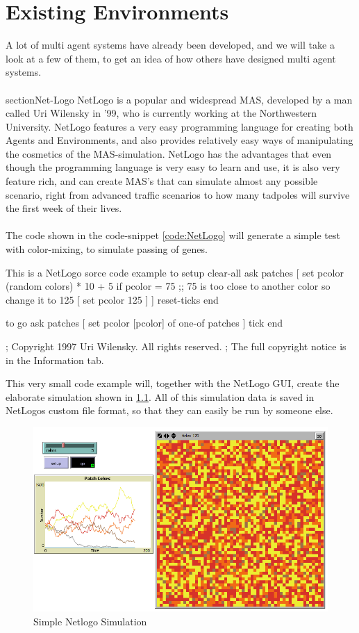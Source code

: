 \chapter{Existing Environments}

A lot of multi agent systems have already been developed, and we will take a look at a few of them, to get an idea of how others have designed multi agent systems.\\
\\
section{Net-Logo}
NetLogo is a popular and widespread MAS, developed by a man called Uri Wilensky in '99, who is currently working at the Northwestern University. \cite{misc:northwestern}
\indent NetLogo features a very easy programming language for creating both Agents and Environments, and also provides relatively easy ways of manipulating the cosmetics of the MAS-simulation. NetLogo has the advantages that even though the programming language is very easy to learn and use, it is also very feature rich, and can create MAS's that can simulate almost any possible scenario, right from advanced traffic scenarios to how many tadpoles will survive the first week of their lives. \\
\\
The code shown in the code-snippet \ref{code:NetLogo} will generate a simple test with color-mixing, to simulate passing of genes.

\begin{NetLogo}{This is a NetLogo sorce code example \label{code:NetLogo}}{}
to setup
  clear-all
  ask patches
    [ set pcolor (random colors) * 10 + 5
        if pcolor = 75  ;; 75 is too close to another color so change it to 125
          [ set pcolor 125 ] ]
  reset-ticks
end

to go
  ask patches [ set pcolor [pcolor] of one-of patches ]
  tick
end


; Copyright 1997 Uri Wilensky. All rights reserved.
; The full copyright notice is in the Information tab.
\end{NetLogo}

This very small code example will, together with the NetLogo GUI, create the elaborate simulation shown in \ref{fig:NetLogoscreen}. All of this simulation data is saved in NetLogos custom file format, so that they can easily be run by someone else.

\begin{figure}%
\begin{center}
\includegraphics[width=\textwidth*0.9]{Images/NetLogo.png}%
\end{center}
\caption{Simple Netlogo Simulation}%
\label{fig:NetLogoscreen}%
\end{figure}

